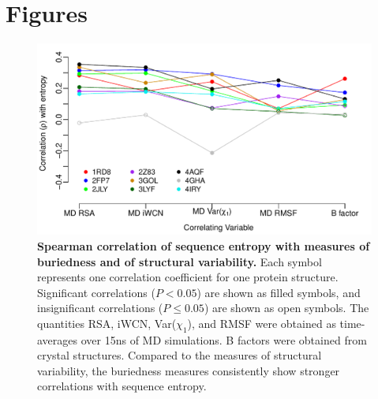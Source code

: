 \documentclass[12pt]{article}
\begin{document}
\cleardoublepage

\section*{Figures}


\begin{figure}[tbh]
\begin{center}
    \includegraphics[height=0.35\textheight]{cor_entropy_all.pdf}
\end{center}
\caption{\textbf{Spearman correlation of sequence entropy with measures of buriedness and of structural variability.} Each symbol represents one correlation coefficient for one protein structure. Significant correlations ($P<0.05$) are shown as filled symbols, and insignificant correlations ($P\leq0.05$) are shown as open symbols. The quantities RSA, iWCN, Var($\chi_1$), and RMSF were obtained as time-averages over 15ns of MD simulations. B factors were obtained from crystal structures. Compared to the measures of structural variability, the buriedness measures consistently show stronger correlations with sequence entropy.}
\label{fig:cor_entropy_all}
\end{figure}
\end{document}
